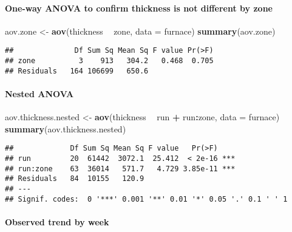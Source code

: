 \documentclass[]{book}
\newenvironment{Shaded}{\begin{snugshade}}{\end{snugshade}}
\newcommand{\DataTypeTok}[1]{\textcolor[rgb]{0.13,0.29,0.53}{#1}}
\newcommand{\KeywordTok}[1]{\textcolor[rgb]{0.13,0.29,0.53}{\textbf{#1}}}
\newcommand{\NormalTok}[1]{#1}
\newcommand{\OperatorTok}[1]{\textcolor[rgb]{0.81,0.36,0.00}{\textbf{#1}}}
\newcommand{\StringTok}[1]{\textcolor[rgb]{0.31,0.60,0.02}{#1}}
\let\oldparagraph\paragraph
\renewcommand{\paragraph}[1]{\oldparagraph{#1}\mbox{}}
\theoremstyle{definition}
\theoremstyle{definition}
\theoremstyle{definition}
\theoremstyle{remark}
\begin{document}
\hypertarget{one-way-anova-to-confirm-thickness-is-not-different-by-zone}{%
\paragraph{One-way ANOVA to confirm thickness is not different by
zone}\label{one-way-anova-to-confirm-thickness-is-not-different-by-zone}}

\begin{Shaded}
\begin{Highlighting}[]
\NormalTok{aov.zone <-}\StringTok{ }\KeywordTok{aov}\NormalTok{(thickness }\OperatorTok{~}\StringTok{ }\NormalTok{zone, }\DataTypeTok{data =}\NormalTok{ furnace)}
\KeywordTok{summary}\NormalTok{(aov.zone)}
\end{Highlighting}
\end{Shaded}

\begin{verbatim}
##              Df Sum Sq Mean Sq F value Pr(>F)
## zone          3    913   304.2   0.468  0.705
## Residuals   164 106699   650.6
\end{verbatim}

\hypertarget{nested-anova}{%
\paragraph{Nested ANOVA}\label{nested-anova}}

\begin{Shaded}
\begin{Highlighting}[]
\NormalTok{aov.thickness.nested <-}\StringTok{ }\KeywordTok{aov}\NormalTok{(thickness }\OperatorTok{~}\StringTok{ }\NormalTok{run }\OperatorTok{+}\StringTok{ }\NormalTok{run}\OperatorTok{:}\NormalTok{zone, }\DataTypeTok{data =}\NormalTok{ furnace)}
\KeywordTok{summary}\NormalTok{(aov.thickness.nested)}
\end{Highlighting}
\end{Shaded}

\begin{verbatim}
##             Df Sum Sq Mean Sq F value   Pr(>F)    
## run         20  61442  3072.1  25.412  < 2e-16 ***
## run:zone    63  36014   571.7   4.729 3.85e-11 ***
## Residuals   84  10155   120.9                     
## ---
## Signif. codes:  0 '***' 0.001 '**' 0.01 '*' 0.05 '.' 0.1 ' ' 1
\end{verbatim}

\hypertarget{observed-trend-by-week}{%
\paragraph{Observed trend by week}\label{observed-trend-by-week}}
\end{document}
